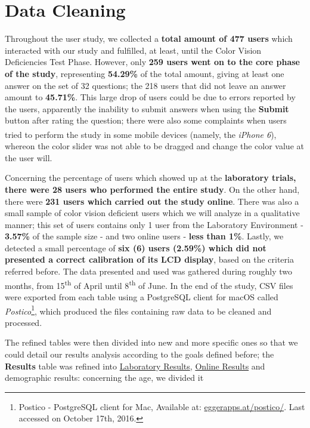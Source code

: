 \section{Data Cleaning}
\label{sec:results_datacleaning}
%
Throughout the user study, we collected a \textbf{total amount of 477 users} which interacted with our study and fulfilled,
at least, until the Color Vision Deficiencies Test Phase. However, only \textbf{259 users went on to the core phase of the study},
representing \textbf{54.29\%} of the total amount, giving at least one answer on the set of 32 questions; the 218 users that did not leave an answer
amount to \textbf{45.71\%}. This large drop of users could be due to errors
reported by the users, apparently the inability to submit answers when using the \textbf{Submit} button after rating the question; there were also some complaints
when users tried to perform the study in some mobile devices (namely, the \emph{iPhone\textsuperscript{\textregistered} 6}), whereon the color slider was
not able to be dragged and change the color value at the user will. \par
%
Concerning the percentage of users which showed up at the \textbf{laboratory trials, there were 28 users who performed the entire study}.
On the other hand, there were \textbf{231 users which carried out the study online}. There was also a small sample of color vision
deficient users which we will analyze in a qualitative manner; this set of users contains only 1 user from the Laboratory Environment - \textbf{3.57\%} of
the sample size - and two online users - \textbf{less than 1\%}. Lastly, we detected a small percentage of \textbf{six (6) users (2.59\%) which did not
presented a correct calibration of its LCD display}, based on the criteria referred before.
%
The data presented and used was gathered during roughly two months, from 15\textsuperscript{th} of April until 8\textsuperscript{th}
of June. In the end of the study, \gls{CSV} files were exported from each table using a PostgreSQL client for macOS called
\emph{Postico}\footnote{Postico - PostgreSQL client for Mac, Available at: \url{eggerapps.at/postico/}. Last accessed on
October 17th, 2016.}, which produced the files containing raw data to be cleaned and processed. \par
%
The refined tables were then divided into new and more specific ones so that we could detail our results analysis according to the goals defined before;
the \textbf{Results} table was refined into \ul{Laboratory Results}, \ul{Online Results} and demographic results: concerning the age, we divided it

